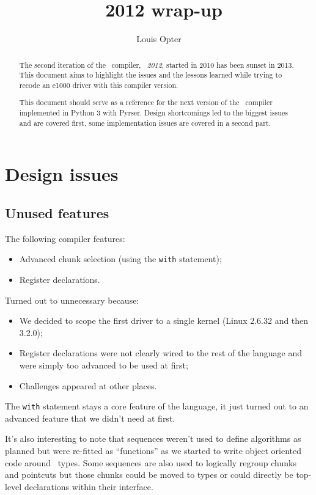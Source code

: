 \documentclass[american]{rtxarticle}
\title{\rtx\ 2012 wrap-up}
\author{Louis Opter}
\begin{document}
 

\maketitle 

\begin{abstract}
The second iteration of the \rtx\ compiler, \emph{\rtx\ 2012}, started in 2010
has been sunset in 2013. This document aims to highlight the issues and the
lessons learned while trying to recode an e1000 driver with this compiler
version.

This document should serve as a reference for the next version of the \rtx\
compiler implemented in Python 3 with Pyrser. Design shortcomings led to the
biggest issues and are covered first, some implementation issues are covered in
a second part.
\end{abstract}

\section{Design issues}

\subsection{Unused features}

The following compiler features:

\begin{itemize}
\item Advanced chunk selection (using the \texttt{with} statement);
\item Register declarations.
\end{itemize}

Turned out to unnecessary because:

\begin{itemize}
\item We decided to scope the first driver to a single kernel (Linux 2.6.32 and
      then 3.2.0);
\item Register declarations were not clearly wired to the rest of the language
      and were simply too advanced to be used at first;
\item Challenges appeared at other places.
\end{itemize}

The \texttt{with} statement stays a core feature of the language, it just
turned out to an advanced feature that we didn't need at first.

It's also interesting to note that sequences weren't used to define algorithms
as planned but were re-fitted as ``functions'' as we started to write object
oriented code around \rtx\ types. Some sequences are also used to logically
regroup chunks and pointcuts but those chunks could be moved to types or could
directly be top-level declarations within their interface.
\end{document}
